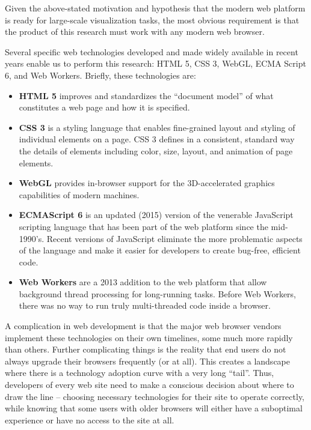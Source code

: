 Given the above-stated motivation and hypothesis that the modern web platform is ready for large-scale visualization tasks, the most obvious requirement is that the product of this research must work with any modern web browser.

Several specific web technologies developed and made widely available in recent years enable us to perform this research: HTML 5, CSS 3, WebGL, ECMA Script 6, and Web Workers. Briefly, these technologies are:

\begin{itemize}
\tightlist
\item
  \textbf{HTML 5} improves and standardizes the ``document model'' of
  what constitutes a web page and how it is specified.
\item
  \textbf{CSS 3} is a styling language that enables fine-grained layout
  and styling of individual elements on a page. CSS 3 defines in a
  consistent, standard way the details of elements including color,
  size, layout, and animation of page elements.
\item
  \textbf{WebGL} provides in-browser support for the 3D-accelerated
  graphics capabilities of modern machines.
\item
  \textbf{ECMAScript 6} is an updated (2015) version of the venerable
  JavaScript scripting language that has been part of the web platform
  since the mid-1990's. Recent versions of JavaScript eliminate the
  more problematic aspects of the language and make it easier for
  developers to create bug-free, efficient code.
\item
  \textbf{Web Workers} are a 2013 addition to the web platform
  that allow background thread processing for long-running tasks. Before
  Web Workers, there was no way to run truly multi-threaded code inside
  a browser.
\end{itemize}

A complication in web development is that the major web browser vendors implement these technologies on their own timelines, some much more rapidly than others. Further complicating things is the reality that end users do not always upgrade their browsers frequently (or at all). This creates a landscape where there is a technology adoption curve with a very long ``tail''. Thus, developers of every web site need to make a conscious decision about where to draw the line -- choosing necessary technologies for their site to operate correctly, while knowing that some users with older browsers will either have a suboptimal experience or have no access to the site at all.

